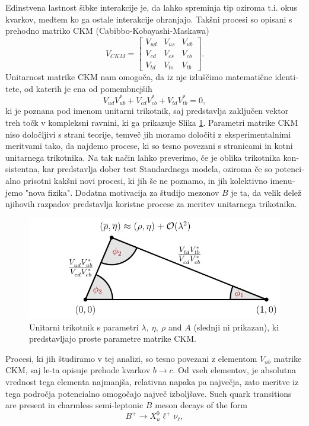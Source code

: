 \documentclass[headings=standardclasses,headings=big,oneside,a4paper,openany,12pt]{scrbook}
\begin{document}
\begin{otherlanguage}{slovene}
Edinstvena lastnost šibke interakcije je, da lahko spreminja tip oziroma t.i. okus kvarkov, medtem ko ga ostale interakcije ohranjajo. Takšni procesi so opisani s prehodno matriko CKM (Cabibbo-Kobayashi-Maskawa) \cite{cabibbo1963unitary,kobayashi1973cp}
\begin{equation}
V_{CKM} = \begin{bmatrix}
    V_{ud} & V_{us} & V_{ub}\\
	V_{cd} & V_{cs} & V_{cb}\\
	V_{td} & V_{ts} & V_{tb}
\end{bmatrix}.
\end{equation}
Unitarnost matrike CKM nam omogoča, da iz nje izluščimo matematične identitete, od katerih je ena od pomembnejših
\begin{equation}
V_{ud}V_{ub}^* + V_{cd}V_{cb}^* + V_{td}V_{tb}^* = 0,
\end{equation}
ki je poznana pod imenom unitarni trikotnik, saj predstavlja zaključen vektor treh točk v kompleksni ravnini, ki ga prikazuje Slika \ref{fig:ut_si}. Parametri matrike CKM niso določljivi s strani teorije, temveč jih moramo določiti z eksperimentalnimi meritvami tako, da najdemo procese, ki so tesno povezani s stranicami in kotni unitarnega trikotnika. Na tak način lahko preverimo, če je oblika trikotnika konsistentna, kar predstavlja dober test Standardnega modela, oziroma če so potencialno prisotni kakšni novi procesi, ki jih še ne poznamo, in jih kolektivno imenujemo "nova fizika". Dodatna motivacija za študijo mezonov $B$ je ta, da velik delež njihovih razpadov predstavlja koristne procese za meritev unitarnega trikotnika.
\begin{figure}[H]
\centering
\includegraphics[scale=1]{texfig/UT_Triangle}
\caption{Unitarni trikotnik s parametri $\lambda,~\eta,~\rho$ and $A$ (slednji ni prikazan), ki predstavljajo proste parametre matrike CKM.} %
\label{fig:ut_si}
\end{figure}

Procesi, ki jih študiramo v tej analizi, so tesno povezani z elementom $V_{ub}$ matrike CKM, saj le-ta opisuje prehode kvarkov $b \to c$. Od vseh elementov, je absolutna vrednost tega elementa najmanjša, relativna napaka pa največja, zato meritve iz tega področja potencialno omogočajo največ izboljšave. Such quark transitions are present in charmless semi-leptonic $B$ meson decays of the form
\begin{equation}
B^+ \to X_u^0 \ell^+ \nu_\ell,
\end{equation}


\end{otherlanguage}
\end{document}

